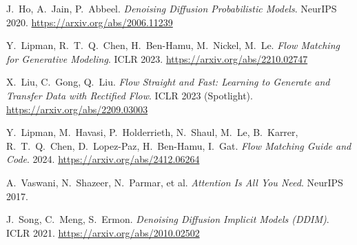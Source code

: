 \documentclass[11pt, a4paper]{article}
\begin{document}
\begin{enumerate}[label={[\arabic*]}]
  \item J.~Ho, A.~Jain, P.~Abbeel.
    \textit{Denoising Diffusion Probabilistic Models}.
    NeurIPS 2020.
    \url{https://arxiv.org/abs/2006.11239}

  \item Y.~Lipman, R.~T.~Q.~Chen, H.~Ben-Hamu, M.~Nickel, M.~Le.
    \textit{Flow Matching for Generative Modeling}.
    ICLR 2023.
    \url{https://arxiv.org/abs/2210.02747}

  \item X.~Liu, C.~Gong, Q.~Liu.
    \textit{Flow Straight and Fast: Learning to Generate and Transfer
    Data with Rectified Flow}.
    ICLR 2023 (Spotlight).
    \url{https://arxiv.org/abs/2209.03003}

  \item Y.~Lipman, M.~Havasi, P.~Holderrieth, N.~Shaul, M.~Le,
    B.~Karrer, R.~T.~Q.~Chen, D.~Lopez-Paz, H.~Ben-Hamu, I.~Gat.
    \textit{Flow Matching Guide and Code}.
    2024.
    \url{https://arxiv.org/abs/2412.06264}

  \item A.~Vaswani, N.~Shazeer, N.~Parmar, et al.
    \textit{Attention Is All You Need}.
    NeurIPS 2017.

  \item J.~Song, C.~Meng, S.~Ermon.
    \textit{Denoising Diffusion Implicit Models (DDIM)}.
    ICLR 2021.
    \url{https://arxiv.org/abs/2010.02502}
\end{enumerate}
\end{document}
